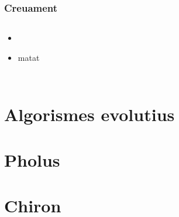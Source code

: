 \documentclass{beamer}
\begin{document}
\begin{frame}
	\frametitle{Creuament}
	\begin{columns}[c]
		\begin{itemize}
			\item 
				\pause
			\item matat
		\end{itemize}
	\end{columns}
\end{frame}

\begin{frame}
\end{frame}

\section{Algorismes evolutius} %
\label{sec:Algorismes evolutius}


\section{Pholus} %
\label{sec:Pholus}

\section{Chiron} %
\label{sec:Chiron}
\end{document}
